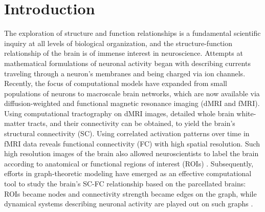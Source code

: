 \documentclass{article}
\begin{document}
\section{Introduction}
The exploration of structure and function relationships is a fundamental scientific inquiry at all levels of biological organization, and the structure-function relationship of the brain is of immense interest in neuroscience. Attempts at mathematical formulations of neuronal activity began with describing currents traveling through a neuron's membranes and being charged via ion channels\cite{hodgkin_quantitative_1952}. Recently, the focus of computational models have expanded from small populations of neurons to macroscale brain networks, which are now available via diffusion-weighted and functional magnetic resonance imaging (dMRI and fMRI). Using computational tractography on dMRI images, detailed whole brain white-matter tracts, and their connectivity can be obtained, to yield the brain's structural connectivity (SC). Using correlated activation patterns over time in fMRI data reveals functional connectivity (FC) with high spatial resolution. Such high resolution images of the brain also allowed neuroscientists to label the brain according to anatomical or functional regions of interest (ROIs) \cite{Desikan2006, craddock_whole_2012}. Subsequently, efforts in graph-theoretic modeling have emerged as an effective computational tool to study the brain's SC-FC relationship based on the parcellated brains: ROIs became nodes and connectivity strength became edges on the graph, while dynamical systems describing neuronal activity are played out on such graphs \cite{bassett_human_2009,bullmore_complex_2009,cao_topological_2014}.
\end{document}
